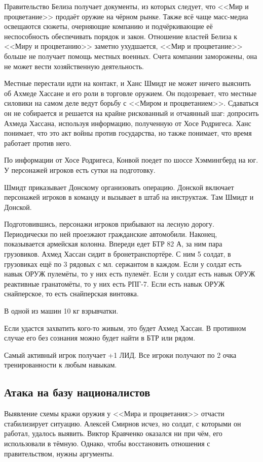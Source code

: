 \documentclass{article}
\begin{document}
Правительство Белиза получает документы, из которых следует, что <<Мир и
процветание>> продаёт оружие на чёрном рынке. Также всё чаще масс-медиа
освещаются сюжеты, очерняющие компанию и подчёркивающие её неспособность
обеспечивать порядок и закон. Отношение властей Белиза к <<Миру и
процветанию>> заметно ухудшается, <<Мир и процветание>> больше не получает
помощь местных военных. Счета компании заморожены, она не может вести
хозяйственную деятельность.

Местные перестали идти на контакт, и Ханс Шмидт не может ничего выяснить
об Ахмеде Хассане и его роли в торговле оружием. Он подозревает, что
местные силовики на самом деле ведут борьбу с <<Миром и процветанием>>.
Сдаваться он не собирается и решается на крайне рискованный и отчаянный
шаг: допросить Ахмеда Хассана, используя информацию, полученную от Хосе
Родригеса. Ханс понимает, что это акт войны против государства, но также
понимает, что время работает против него.

По информации от Хосе Родригеса, Конвой поедет по шоссе Хэммингберд на
юг. У персонажей игроков есть сутки на подготовку.

Шмидт приказывает Донскому организовать операцию. Донской включает
персонажей игроков в команду и вызывает в штаб на инструктаж. Там Шмидт
и Донской.

Подготовившись, персонажи игроков прибывают на лесную дорогу.
Периодически по ней проезжают гражданские автомобили. Наконец,
показывается армейская колонна. Впереди едет БТР 82 А, за ним пара
грузовиков. Ахмед Хассан сидит в бронетранспортёре. С ним 5 солдат, в
грузовиках ещё по 3 рядовых с мл. сержантом в каждом. Если у солдат есть
навык ОРУЖ пулемёты, то у них есть пулемёт. Если у солдат есть навык
ОРУЖ реактивные гранатомёты, то у них есть РПГ-7. Если есть навык ОРУЖ
снайперское, то есть снайперская винтовка.

В одной из машин 10 кг взрывчатки.

Если удастся захватить кого-то живым, это будет Ахмед Хассан. В
противном случае его без сознания можно будет найти в БТР или рядом.

Самый активный игрок получает +1 ЛИД. Все игроки получают по 2 очка
тренированности к любым навыкам.

\subsection{Атака на базу
националистов}\label{nationalist-base-attack}

Выявление схемы кражи оружия у <<Мира и процветания>> отчасти
стабилизирует ситуацию. Алексей Смирнов исчез, но солдат, с которыми он
работал, удалось выявить. Виктор Кравченко оказался ни при чём, его
использовали в тёмную. Однако, чтобы восстановить отношения с
правительством, нужны аргументы.
\end{document}
